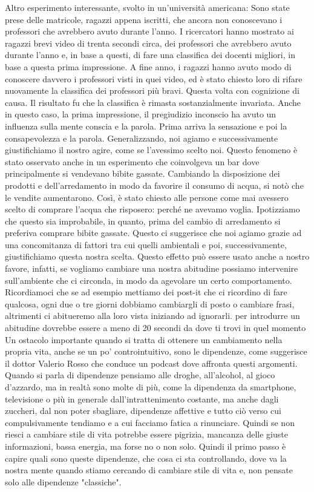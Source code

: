 \documentclass[12pt]{book} %
\begin{document}
Altro esperimento interessante, svolto in un'università americana: Sono state prese delle
matricole, ragazzi appena iscritti, che ancora non conoscevano i professori che avrebbero avuto durante
l'anno. I ricercatori hanno mostrato ai ragazzi brevi video di trenta secondi circa, dei
professori che avrebbero avuto durante l'anno e, in base a questi, di fare una classifica dei
docenti migliori, in base a questa prima impressione. A fine anno, i ragazzi hanno avuto modo di conoscere davvero i
professori visti in quei video, ed è stato chiesto loro di rifare nuovamente la classifica dei professori più bravi.
Questa volta con cognizione di causa. Il risultato fu che la classifica è rimasta sostanzialmente invariata. Anche in
questo caso, la prima impressione, il pregiudizio inconscio ha avuto un influenza sulla mente conscia e la parola. Prima arriva
la sensazione e poi la consapevolezza e la parola.
Generalizzando, noi agiamo e successivamente giustifichiamo il nostro agire, come se l'avessimo
scelto noi. Questo fenomeno è stato osservato anche in un esperimento che coinvolgeva un bar dove principalmente si
vendevano bibite gassate. Cambiando la disposizione dei prodotti e dell'arredamento in modo da
favorire il consumo di acqua, si notò che le vendite aumentarono. Così, è stato chiesto alle persone come mai avessero
scelto di comprare l'acqua che risposero: perché ne avevamo voglia. Ipotizziamo che questo sia improbabile, in quanto, prima del cambio di arredamento si preferiva comprare bibite gassate. Questo ci
suggerisce che noi agiamo grazie ad una concomitanza di fattori tra cui quelli ambientali e poi, successivamente,
giustifichiamo questa nostra scelta. Questo effetto può essere usato anche a nostro favore,
infatti, se vogliamo cambiare una nostra abitudine possiamo intervenire sull'ambiente che ci
circonda, in modo da agevolare un certo comportamento.
Ricordiamoci che se ad esempio mettiamo dei post-it che ci ricordino di fare qualcosa, ogni due o tre giorni dobbiamo cambiargli di posto o cambiare frasi, altrimenti ci abitueremo alla loro vista iniziando ad ignorarli.
per introdurre un abitudine dovrebbe essere a meno di 20 secondi da dove ti trovi
in quel momento
Un ostacolo importante quando si tratta di ottenere un cambiamento nella propria vita, anche se un po' controintuitivo, sono le dipendenze, come suggerisce il dottor Valerio Rosso che conduce un podcast dove affronta questi argomenti. Quando si parla di dipendenze pensiamo alle droghe, all'alcohol, al gioco d'azzardo, ma in realtà sono molte di più, come la dipendenza da smartphone, televisione o più in generale dall'intrattenimento costante, ma anche dagli zuccheri, dal non poter sbagliare, dipendenze affettive e tutto ciò verso cui compulsivamente tendiamo e a cui facciamo fatica a rinunciare. Quindi se non riesci a cambiare stile di vita potrebbe essere pigrizia, mancanza delle giuste informazioni, bassa energia, ma forse no o non solo. Quindi il primo passo è capire quali sono queste dipendenze, che cosa ci sta controllando, dove va la nostra mente quando stiamo cercando di cambiare stile di vita e, non pensate solo alle dipendenze "classiche".
\end{document}
